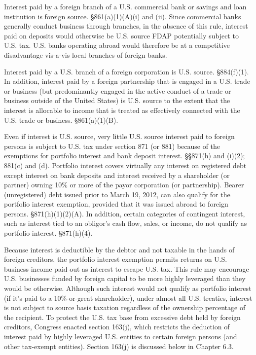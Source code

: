 Interest paid by a foreign branch of a U.S. commercial bank or savings and loan institution is foreign source. \S861(a)(1)(A)(i) and (ii).  Since commercial banks generally conduct business through branches, in the absence of this rule, interest paid on deposits would otherwise be U.S. source FDAP potentially subject to U.S. tax.  U.S. banks operating abroad would therefore be at a competitive disadvantage vis-a-vis local branches of foreign banks.  

Interest paid by a U.S. branch of a foreign corporation is U.S. source.  \S884(f)(1).  In addition, interest paid by a foreign partnership that is engaged in a U.S. trade or business (but predominantly engaged in the active conduct of a trade or business outside of the United States) is U.S. source to the extent that the interest is allocable to income that is treated as effectively connected with the U.S. trade or business.  \S861(a)(1)(B).

Even if interest is U.S. source, very little U.S. source interest paid to foreign persons is subject to U.S. tax under section 871 (or 881) because of the exemptions for portfolio interest and bank deposit interest.  \S\S 871(h) and (i)(2); 881(c) and (d).  Portfolio interest covers virtually any interest on registered debt except interest on bank deposits and interest received by a shareholder (or partner) owning 10\% or more of the payor corporation (or partnership).  Bearer (unregistered) debt issued prior to March 19, 2012, can also qualify for the portfolio interest exemption, provided that it was issued abroad to foreign persons.  \S871(h)(1)(2)(A). In addition, certain categories of contingent interest, such as interest tied to an obligor's cash flow, sales, or income, do not qualify as portfolio interest. \S871(h)(4).  

Because interest is deductible by the debtor and not taxable in the hands of foreign creditors, the portfolio interest exemption permits returns on U.S. business income paid out as interest to escape U.S. tax.  This rule may encourage U.S. businesses funded by foreign capital to be more highly leveraged than they would be otherwise.  Although such interest would not qualify as portfolio interest (if it's paid to a 10\%-or-great shareholder), under almost all U.S. treaties, interest is not subject to source basis taxation regardless of the ownership percentage of the recipient.  To protect the U.S. tax base from excessive debt held by foreign creditors, Congress enacted section 163(j), which restricts the deduction of interest paid by highly leveraged U.S. entities to certain foreign persons (and other tax-exempt entities).  Section 163(j) is discussed below in Chapter 6.3.

